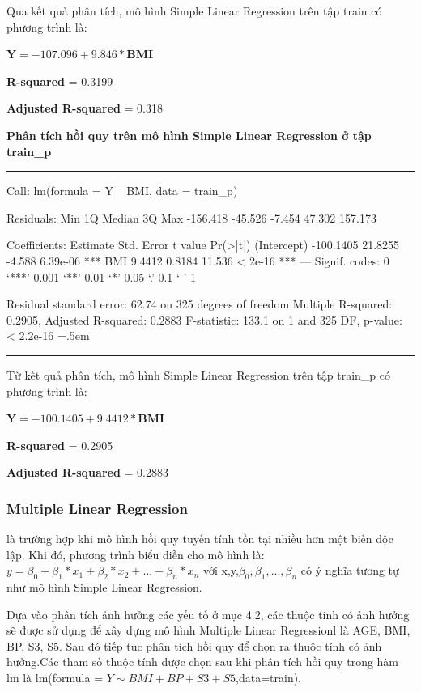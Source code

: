 \documentclass[runningheads]{llncs}
\newenvironment{lcverbatim}
 {\SaveVerbatim{cverb}}
 {\endSaveVerbatim
  \flushleft\fboxrule=0pt\fboxsep=.5em
  \colorbox{cverbbg}{%
    \makebox[\dimexpr\linewidth-2\fboxsep][l]{\BUseVerbatim{cverb}}%
  }
  \endflushleft
}
\begin{document}
Qua kết quả phân tích, mô hình Simple Linear Regression trên tập train có phương trình là:
\begin{center}
	$\textbf{Y}=  -107.096 + 9.846*\textbf{BMI}$
\end{center}

\textbf{R-squared} = 0.3199

\textbf{Adjusted R-squared} = 0.318

\vspace{0.5cm}
\textbf{Phân tích hồi quy trên mô hình Simple Linear Regression ở tập train\_p}
\vspace{0.5cm}
\hrule
\begin{lcverbatim}
Call:
lm(formula = Y ~ BMI, data = train_p)

Residuals:
     Min       1Q   Median       3Q      Max 
-156.418  -45.526   -7.454   47.302  157.173 

Coefficients:
             Estimate Std. Error t value Pr(>|t|)    
(Intercept) -100.1405    21.8255  -4.588 6.39e-06 ***
BMI            9.4412     0.8184  11.536  < 2e-16 ***
---
Signif. codes:  0 ‘***’ 0.001 ‘**’ 0.01 ‘*’ 0.05 ‘.’ 0.1 ‘ ’ 1

Residual standard error: 62.74 on 325 degrees of freedom
Multiple R-squared:  0.2905,	Adjusted R-squared:  0.2883 
F-statistic: 133.1 on 1 and 325 DF,  p-value: < 2.2e-16
\end{lcverbatim}
\hrule
\vspace{0.5cm}

Từ kết quả phân tích, mô hình Simple Linear Regression trên tập train\_p có phương trình là:
\begin{center}
	$\textbf{Y}=  -100.1405 + 9.4412*\textbf{BMI}$
\end{center}

\textbf{R-squared} = 0.2905 

\textbf{Adjusted R-squared} = 0.2883

\subsubsection{Multiple Linear Regression} là trường hợp khi mô hình hồi quy tuyến tính tồn tại nhiều hơn một biến độc lập. Khi đó, phương trình biểu diễn cho mô hình là: $y= \beta_0 +\beta_1*x_1+\beta_2*x_2+...+\beta_n*x_n$ với x,y,$\beta_0, \beta_1,...,\beta_n$ có ý nghĩa tương tự như mô hình Simple Linear Regression.

Dựa vào phân tích ảnh hưởng các yếu tố ở mục 4.2, các thuộc tính có ảnh hưởng sẽ được sử dụng để xây dựng mô hình Multiple Linear Regressionl là AGE, BMI, BP, S3, S5. Sau đó tiếp tục phân tích hồi quy để chọn ra thuộc tính có ảnh hưởng.Các tham số thuộc tính được chọn sau khi phân tích hồi quy trong hàm lm là lm(formula = $Y\sim BMI+BP+S3+S5$,data=train).
\end{document}
